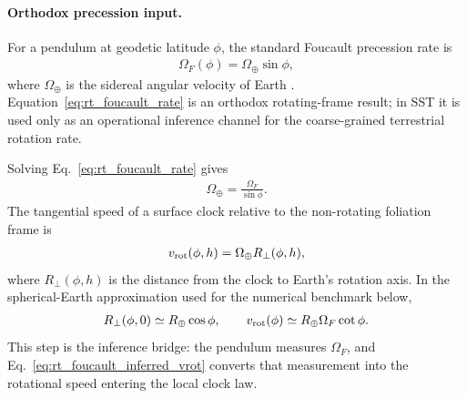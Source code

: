 \paragraph{Orthodox precession input.}
For a pendulum at geodetic latitude $\phi$, the standard Foucault precession rate is
\begin{align}
    \Omega_F(\phi)
    =
    \Omega_\oplus\sin\phi,
    \label{eq:rt_foucault_rate}
\end{align}
where $\Omega_\oplus$ is the sidereal angular velocity of Earth \cite{Foucault1851,Coriolis1835}.  Equation~\eqref{eq:rt_foucault_rate} is an orthodox rotating-frame result; in SST it is used only as an operational inference channel for the coarse-grained terrestrial rotation rate.

Solving Eq.~\eqref{eq:rt_foucault_rate} gives
\begin{align}
    \Omega_\oplus
    =
    \frac{\Omega_F}{\sin\phi}.
\end{align}
The tangential speed of a surface clock relative to the non-rotating foliation frame is
\begin{align}
    v_{\rm rot}(\phi,h)
    =
    \Omega_\oplus R_\perp(\phi,h),
    \label{eq:rt_foucault_inferred_vrot_general}
\end{align}
where $R_\perp(\phi,h)$ is the distance from the clock to Earth's rotation axis.  In the spherical-Earth approximation used for the numerical benchmark below,
\begin{align}
    R_\perp(\phi,0)
    \simeq
    R_\oplus\cos\phi,
    \qquad
    v_{\rm rot}(\phi)
    \simeq
    R_\oplus\Omega_F\cot\phi .
    \label{eq:rt_foucault_inferred_vrot}
\end{align}
This step is the inference bridge: the pendulum measures $\Omega_F$, and Eq.~\eqref{eq:rt_foucault_inferred_vrot} converts that measurement into the rotational speed entering the local clock law.

